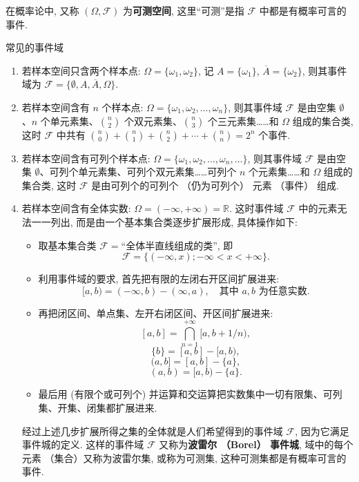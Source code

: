 在概率论中,
又称 $(\Omega, \mathscr{F})$ 为\textbf{可测空间},
这里“可测”是指 $\mathscr{F}$ 中都是有概率可言的事件.

\begin{example}
  常见的事件域
  \begin{enumerate}
    \item 若样本空间只含两个样本点: $\Omega = \{\omega_1, \omega_2\}$, 记 $A = \{\omega_1\}$, $\overline{A} = \{\omega_2\}$, 则其事件域为 $\mathscr{F} = \{\emptyset, A, \overline{A}, \Omega\}$.
    \item 若样本空间含有 $n$ 个样本点: $\Omega = \{\omega_1, \omega_2, \dotsc, \omega_n\}$, 则其事件域 $\mathscr{F}$ 是由空集 $\emptyset$、$n$ 个单元素集、$\binom{n}{2}$ 个双元素集、$\binom{n}{3}$ 个三元素集……和 $\Omega$ 组成的集合类, 这时 $\mathscr{F}$ 中共有 $\binom{n}{0} + \binom{n}{1} + \binom{n}{2} + \dotsb + \binom{n}{n} = 2^n$ 个事件.
    \item 若样本空间含有可列个样本点: $\Omega = \{\omega_1, \omega_2, \dotsc, \omega_n, \dotsc\}$, 则其事件域 $\mathscr{F}$ 是由空集 $\emptyset$、可列个单元素集、可列个双元素集……可列个 $n$ 个元素集……和 $\Omega$ 组成的集合类, 这时 $\mathscr{F}$ 是由可列个的可列个 （仍为可列个） 元素 （事件） 组成.
    \item 若样本空间含有全体实数: $\Omega = (-\infty, +\infty) = \mathbb{R}$. 这时事件域 $\mathscr{F}$ 中的元素无法一一列出, 而是由一个基本集合类逐步扩展形成, 具体操作如下:
    \begin{itemize}
      \item 取基本集合类 $\mathscr{F} =$“全体半直线组成的类”, 即
      \[ \mathscr{F} = \{(-\infty, x); -\infty < x < +\infty\}.\]
      \item 利用事件域的要求, 首先把有限的左闭右开区间扩展进来:
      \[ [a, b) = (-\infty, b) - (\infty, a), \quad \text{其中 } a, b \text{ 为任意实数}. \]
      \item 再把闭区间、单点集、左开右闭区间、开区间扩展进来:
      \[ [a,b] = \bigcap _{n=1} ^{+\infty} [a, b + 1/n), \]
      \[ \{b\} = [a, b] - [a, b), \]
      \[ (a, b] = [a, b] - \{a\}, \]
      \[ (a, b) = [a, b) - \{a\}. \]
      \item 最后用 (有限个或可列个) 并运算和交运算把实数集中一切有限集、可列集、开集、闭集都扩展进来.
    \end{itemize}

    经过上述几步扩展所得之集的全体就是人们希望得到的事件域 $\mathscr{F}$,
    因为它满足事件城的定义.
    这样的事件域 $\mathscr{F}$ 又称为\textbf{波雷尔 （Borel） 事件城},
    域中的每个元素 （集合）又称为波雷尔集,
    或称为可测集,
    这种可测集都是有概率可言的事件.
  \end{enumerate}
\end{example}


